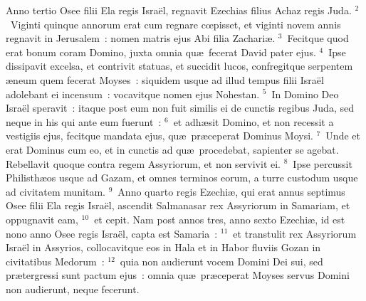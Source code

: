\bchapter
\lettrine[lines=3,image=true,loversize=0.05,lraise=-0.03]{A}{}nno tertio Osee filii Ela regis Isra\"el, regnavit Ezechias filius Achaz regis Juda.
${}^{2}$~Viginti quinque annorum erat cum regnare cœpisset, et viginti novem annis regnavit in Jerusalem~: nomen matris ejus Abi filia Zachari\ae .
${}^{3}$~Fecitque quod erat bonum coram Domino, juxta omnia qu\ae\ fecerat David pater ejus.
${}^{4}$~Ipse dissipavit excelsa, et contrivit statuas, et succidit lucos, confregitque serpentem \ae neum quem fecerat Moyses~: siquidem usque ad illud tempus filii Isra\"el adolebant ei incensum~: vocavitque nomen ejus Nohestan.
${}^{5}$~In Domino Deo Isra\"el speravit~: itaque post eum non fuit similis ei de cunctis regibus Juda, sed neque in his qui ante eum fuerunt~:
${}^{6}$~et adh\ae sit Domino, et non recessit a vestigiis ejus, fecitque mandata ejus, qu\ae\ pr\ae ceperat Dominus Moysi.
${}^{7}$~Unde et erat Dominus cum eo, et in cunctis ad qu\ae\ procedebat, sapienter se agebat. Rebellavit quoque contra regem Assyriorum, et non servivit ei.
${}^{8}$~Ipse percussit Philisth\ae os usque ad Gazam, et omnes terminos eorum, a turre custodum usque ad civitatem munitam.
${}^{9}$~Anno quarto regis Ezechi\ae , qui erat annus septimus Osee filii Ela regis Isra\"el, ascendit Salmanasar rex Assyriorum in Samariam, et oppugnavit eam,
${}^{10}$~et cepit. Nam post annos tres, anno sexto Ezechi\ae , id est nono anno Osee regis Isra\"el, capta est Samaria~:
${}^{11}$~et transtulit rex Assyriorum Isra\"el in Assyrios, collocavitque eos in Hala et in Habor fluviis Gozan in civitatibus Medorum~:
${}^{12}$~quia non audierunt vocem Domini Dei sui, sed pr\ae tergressi sunt pactum ejus~: omnia qu\ae\ pr\ae ceperat Moyses servus Domini non audierunt, neque fecerunt.


